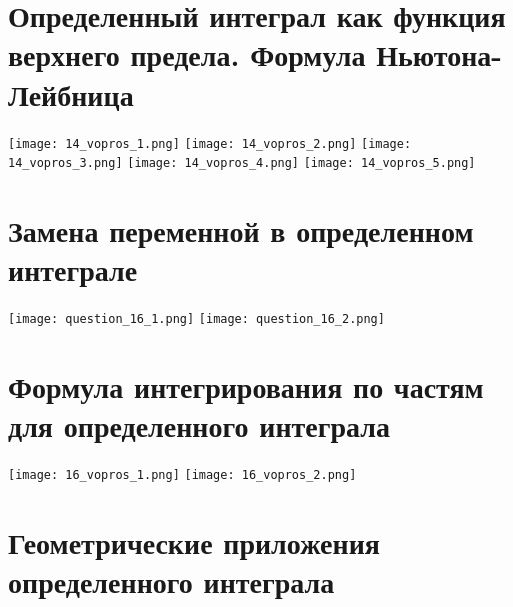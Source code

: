 \documentclass[a4paper,12pt]{article}
\begin{document}
\section{Определенный интеграл как функция верхнего предела. Формула Ньютона-Лейбница}
\texttt{[image: 14\_vopros\_1.png]}
\texttt{[image: 14\_vopros\_2.png]}
\texttt{[image: 14\_vopros\_3.png]}
\texttt{[image: 14\_vopros\_4.png]}
\texttt{[image: 14\_vopros\_5.png]}

\section{Замена переменной в определенном интеграле}
\texttt{[image: question\_16\_1.png]}
\texttt{[image: question\_16\_2.png]}

\section{Формула интегрирования по частям для определенного интеграла}
\texttt{[image: 16\_vopros\_1.png]}
\texttt{[image: 16\_vopros\_2.png]}

\section{Геометрические приложения определенного интеграла}
\end{document}

